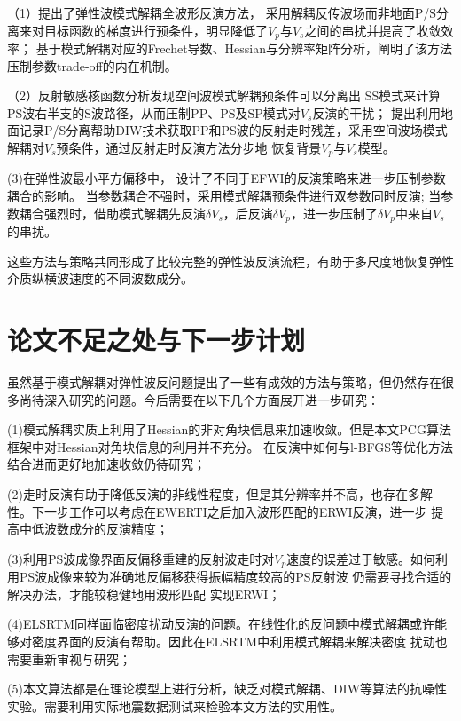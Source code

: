 （1）提出了弹性波模式解耦全波形反演方法，
采用解耦反传波场而非地面P/S分离来对目标函数的梯度进行预条件，明显降低了$V_p$与$V_s$之间的串扰并提高了收敛效率；
基于模式解耦对应的Frechet导数、Hessian与分辨率矩阵分析，阐明了该方法压制参数trade-off的内在机制。

（2）反射敏感核函数分析发现空间波模式解耦预条件可以分离出
SS模式来计算PS波右半支的S波路径，从而压制PP、PS及SP模式对$V_s$反演的干扰；
提出利用地面记录P/S分离帮助DIW技术获取PP和PS波的反射走时残差，采用空间波场模式解耦对$V_s$预条件，通过反射走时反演方法分步地
恢复背景$V_p$与$V_s$模型。

(3)在弹性波最小平方偏移中，
设计了不同于EFWI的反演策略来进一步压制参数耦合的影响。
当参数耦合不强时，采用模式解耦预条件进行双参数同时反演;
当参数耦合强烈时，借助模式解耦先反演$\delta V_s$，后反演$\delta V_p$，进一步压制了$\delta
V_p$中来自$V_s$的串扰。

这些方法与策略共同形成了比较完整的弹性波反演流程，有助于多尺度地恢复弹性介质纵横波速度的不同波数成分。

\section{论文不足之处与下一步计划}
虽然基于模式解耦对弹性波反问题提出了一些有成效的方法与策略，但仍然存在很多尚待深入研究的问题。今后需要在以下几个方面展开进一步研究：

(1)模式解耦实质上利用了Hessian的非对角块信息来加速收敛。但是本文PCG算法框架中对Hessian对角块信息的利用并不充分。
在反演中如何与l-BFGS等优化方法结合进而更好地加速收敛仍待研究；

(2)走时反演有助于降低反演的非线性程度，但是其分辨率并不高，也存在多解性。下一步工作可以考虑在EWERTI之后加入波形匹配的ERWI反演，进一步
提高中低波数成分的反演精度；

(3)利用PS波成像界面反偏移重建的反射波走时对$V_p$速度的误差过于敏感。如何利用PS波成像来较为准确地反偏移获得振幅精度较高的PS反射波
仍需要寻找合适的解决办法，才能较稳健地用波形匹配
实现ERWI；

(4)ELSRTM同样面临密度扰动反演的问题。在线性化的反问题中模式解耦或许能够对密度界面的反演有帮助。因此在ELSRTM中利用模式解耦来解决密度
扰动也需要重新审视与研究；

(5)本文算法都是在理论模型上进行分析，缺乏对模式解耦、DIW等算法的抗噪性实验。需要利用实际地震数据测试来检验本文方法的实用性。
